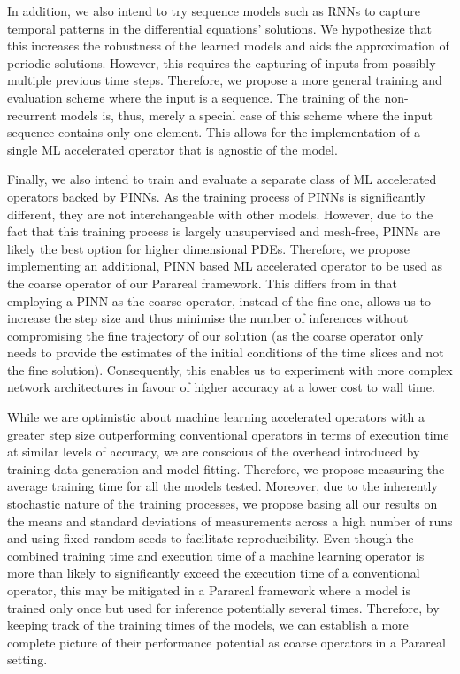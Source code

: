 \documentclass{article}
\begin{document}
In addition, we also intend to try sequence models such as RNNs to capture temporal patterns in the differential equations' solutions. We hypothesize that this increases the robustness of the learned models and aids the approximation of periodic solutions. However, this requires the capturing of inputs from possibly multiple previous time steps. Therefore, we propose a more general training and evaluation scheme where the input is a sequence. The training of the non-recurrent models is, thus, merely a special case of this scheme where the input sequence contains only one element. This allows for the implementation of a single ML accelerated operator that is agnostic of the model.

Finally, we also intend to train and evaluate a separate class of ML accelerated operators backed by PINNs. As the training process of PINNs is significantly different, they are not interchangeable with other models. However, due to the fact that this training process is largely unsupervised and mesh-free, PINNs are likely the best option for higher dimensional PDEs. Therefore, we propose implementing an additional, PINN based ML accelerated operator to be used as the coarse operator of our Parareal framework. This differs from \cite{meng2019} in that employing a PINN as the coarse operator, instead of the fine one, allows us to increase the step size and thus minimise the number of inferences without compromising the fine trajectory of our solution (as the coarse operator only needs to provide the estimates of the initial conditions of the time slices and not the fine solution). Consequently, this enables us to experiment with more complex network architectures in favour of higher accuracy at a lower cost to wall time.

While we are optimistic about machine learning accelerated operators with a greater step size outperforming conventional operators in terms of execution time at similar levels of accuracy, we are conscious of the overhead introduced by training data generation and model fitting. Therefore, we propose measuring the average training time for all the models tested. Moreover, due to the inherently stochastic nature of the training processes, we propose basing all our results on the means and standard deviations of measurements across a high number of runs and using fixed random seeds to facilitate reproducibility. Even though the combined training time and execution time of a machine learning operator is more than likely to significantly exceed the execution time of a conventional operator, this may be mitigated in a Parareal framework where a model is trained only once but used for inference potentially several times. Therefore, by keeping track of the training times of the models, we can establish a more complete picture of their performance potential as coarse operators in a Parareal setting.
\end{document}
